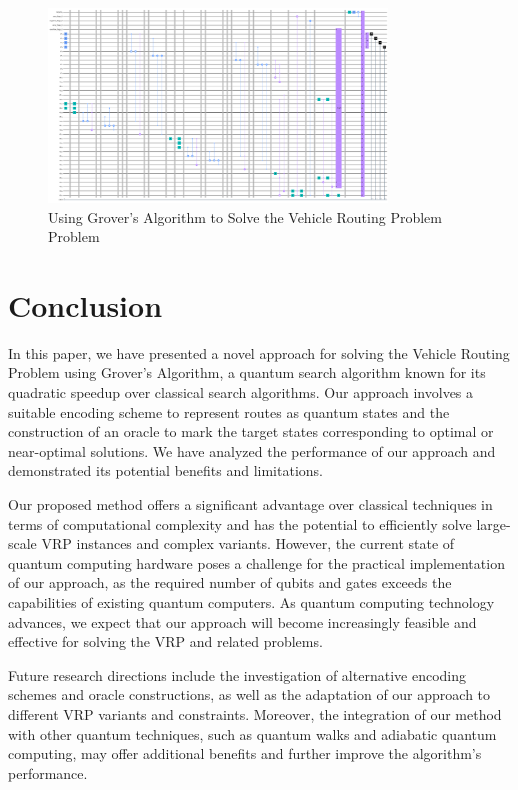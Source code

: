 \begin{figure}[htp]
    \centering
    \includegraphics[width=9cm]{Figures/Vehicle_Routing_Problem_circuit.png}
    \caption{Using Grover's Algorithm to Solve the Vehicle Routing Problem Problem}
    \label{fig:Vehicle_Routing_Problem}
\end{figure}

\section{Conclusion}
\label{sec:conclusion}

In this paper, we have presented a novel approach for solving the Vehicle Routing Problem using Grover's Algorithm, a quantum search algorithm known for its quadratic speedup over classical search algorithms. Our approach involves a suitable encoding scheme to represent routes as quantum states and the construction of an oracle to mark the target states corresponding to optimal or near-optimal solutions. We have analyzed the performance of our approach and demonstrated its potential benefits and limitations.

Our proposed method offers a significant advantage over classical techniques in terms of computational complexity and has the potential to efficiently solve large-scale VRP instances and complex variants. However, the current state of quantum computing hardware poses a challenge for the practical implementation of our approach, as the required number of qubits and gates exceeds the capabilities of existing quantum computers. As quantum computing technology advances, we expect that our approach will become increasingly feasible and effective for solving the VRP and related problems.

Future research directions include the investigation of alternative encoding schemes and oracle constructions, as well as the adaptation of our approach to different VRP variants and constraints. Moreover, the integration of our method with other quantum techniques, such as quantum walks and adiabatic quantum computing, may offer additional benefits and further improve the algorithm's performance.

